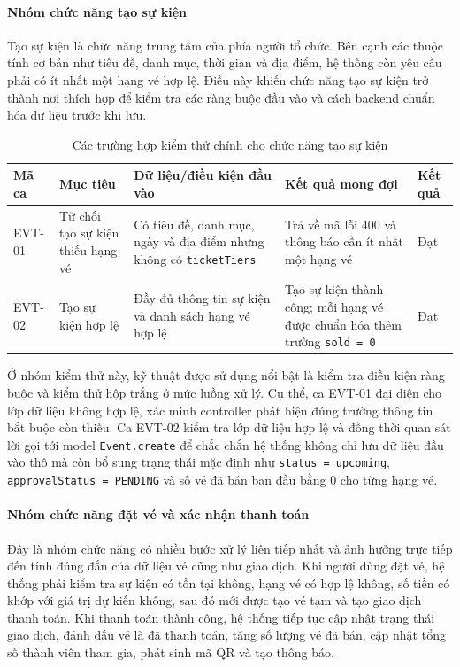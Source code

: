\documentclass[../DoAn.tex]{subfiles}
\begin{document}
\paragraph{Nhóm chức năng tạo sự kiện}\mbox{}

Tạo sự kiện là chức năng trung tâm của phía người tổ chức. Bên cạnh các thuộc tính cơ bản như tiêu đề, danh mục, thời gian và địa điểm, hệ thống còn yêu cầu phải có ít nhất một hạng vé hợp lệ. Điều này khiến chức năng tạo sự kiện trở thành nơi thích hợp để kiểm tra các ràng buộc đầu vào và cách backend chuẩn hóa dữ liệu trước khi lưu.

\begin{table}[H]
\centering
\footnotesize
\renewcommand{\arraystretch}{1.3}
\begin{tabular}{|p{1.8cm}|p{3.4cm}|p{3.9cm}|p{3.9cm}|p{1.7cm}|}
\hline
\textbf{Mã ca} & \textbf{Mục tiêu} & \textbf{Dữ liệu/điều kiện đầu vào} & \textbf{Kết quả mong đợi} & \textbf{Kết quả} \\ \hline
EVT-01 & Từ chối tạo sự kiện thiếu hạng vé & Có tiêu đề, danh mục, ngày và địa điểm nhưng không có \texttt{ticketTiers} & Trả về mã lỗi 400 và thông báo cần ít nhất một hạng vé & Đạt \\ \hline
EVT-02 & Tạo sự kiện hợp lệ & Đầy đủ thông tin sự kiện và danh sách hạng vé hợp lệ & Tạo sự kiện thành công; mỗi hạng vé được chuẩn hóa thêm trường \texttt{sold = 0} & Đạt \\ \hline
\end{tabular}
\caption{Các trường hợp kiểm thử chính cho chức năng tạo sự kiện}
\label{tab:test-event}
\end{table}

Ở nhóm kiểm thử này, kỹ thuật được sử dụng nổi bật là kiểm tra điều kiện ràng buộc và kiểm thử hộp trắng ở mức luồng xử lý. Cụ thể, ca EVT-01 đại diện cho lớp dữ liệu không hợp lệ, xác minh controller phát hiện đúng trường thông tin bắt buộc còn thiếu. Ca EVT-02 kiểm tra lớp dữ liệu hợp lệ và đồng thời quan sát lời gọi tới model \texttt{Event.create} để chắc chắn hệ thống không chỉ lưu dữ liệu đầu vào thô mà còn bổ sung trạng thái mặc định như \texttt{status = upcoming}, \texttt{approvalStatus = PENDING} và số vé đã bán ban đầu bằng 0 cho từng hạng vé.

\paragraph{Nhóm chức năng đặt vé và xác nhận thanh toán}\mbox{}

Đây là nhóm chức năng có nhiều bước xử lý liên tiếp nhất và ảnh hưởng trực tiếp đến tính đúng đắn của dữ liệu vé cũng như giao dịch. Khi người dùng đặt vé, hệ thống phải kiểm tra sự kiện có tồn tại không, hạng vé có hợp lệ không, số tiền có khớp với giá trị dự kiến không, sau đó mới được tạo vé tạm và tạo giao dịch thanh toán. Khi thanh toán thành công, hệ thống tiếp tục cập nhật trạng thái giao dịch, đánh dấu vé là đã thanh toán, tăng số lượng vé đã bán, cập nhật tổng số thành viên tham gia, phát sinh mã \gls{QR} và tạo thông báo.
\end{document}
